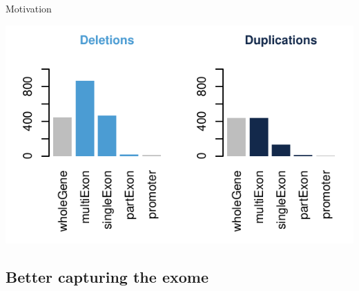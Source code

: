 \documentclass[
  10pt,
  ignorenonframetext,
  m]{beamer}
\begin{document}
\begin{frame}{Motivation}
\protect\hypertarget{motivation-1}{}

\centering

\begin{center}\includegraphics{defense_files/figure-beamer/truty-1} \end{center}

\end{frame}

\hypertarget{better-capturing-the-exome}{%
\subsection{Better capturing the
exome}\label{better-capturing-the-exome}}
\end{document}
